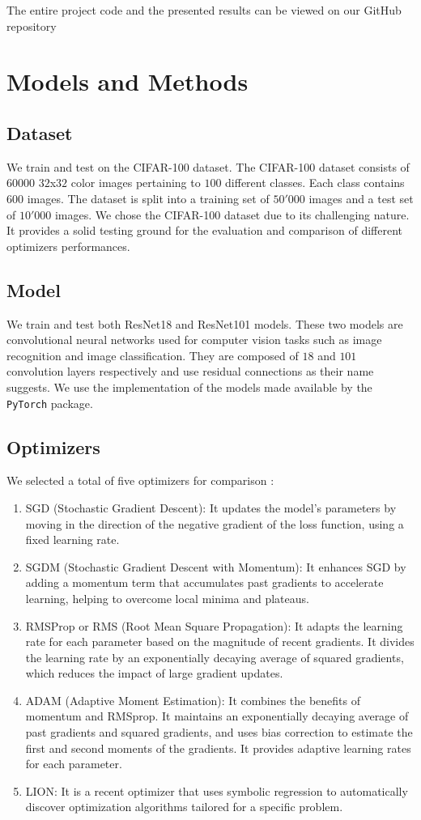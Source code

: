 \documentclass[10pt,conference,compsocconf]{IEEEtran}
\begin{document}
The entire project code and the presented results can be viewed on our GitHub repository \cite{github}

\section{Models and Methods}
\subsection{Dataset}
We train and test on the CIFAR-100 \cite{cifar100} dataset. The CIFAR-100 dataset consists of $60 000$ $32$x$32$ color images pertaining to $100$ different classes. Each class contains $600$ images. The dataset is split into a training set of $50'000$ images and a test set of $10'000$ images. We chose the CIFAR-100 dataset due to its challenging nature. It provides a solid testing ground for the evaluation and comparison of different optimizers performances.

\subsection{Model}
We train and test both ResNet18 and ResNet101 models. These two models are convolutional neural networks used for computer vision tasks such as image recognition and image classification. They are composed of $18$ and $101$ convolution layers respectively and use residual connections as their name suggests. We use the implementation of the models made available by the \verb+PyTorch+ package.

\subsection{Optimizers}
We selected a total of five optimizers for comparison \cite{optimizers}:
\begin{enumerate}
  \item SGD (Stochastic Gradient Descent): It updates the model's parameters by moving in the direction of the negative gradient of the loss function, using a fixed learning rate.
  \item SGDM  (Stochastic Gradient Descent with Momentum): It enhances SGD by adding a momentum term that accumulates past gradients to accelerate learning, helping to overcome local minima and plateaus.
  \item RMSProp or RMS (Root Mean Square Propagation): It adapts the learning rate for each parameter based on the magnitude of recent gradients. It divides the learning rate by an exponentially decaying average of squared gradients, which reduces the impact of large gradient updates.
  \item ADAM  (Adaptive Moment Estimation): It combines the benefits of momentum and RMSprop. It maintains an exponentially decaying average of past gradients and squared gradients, and uses bias correction to estimate the first and second moments of the gradients. It provides adaptive learning rates for each parameter.
  \item LION: It is a recent optimizer that uses symbolic regression to automatically discover optimization algorithms tailored for a specific problem.
\end{enumerate}
\end{document}
